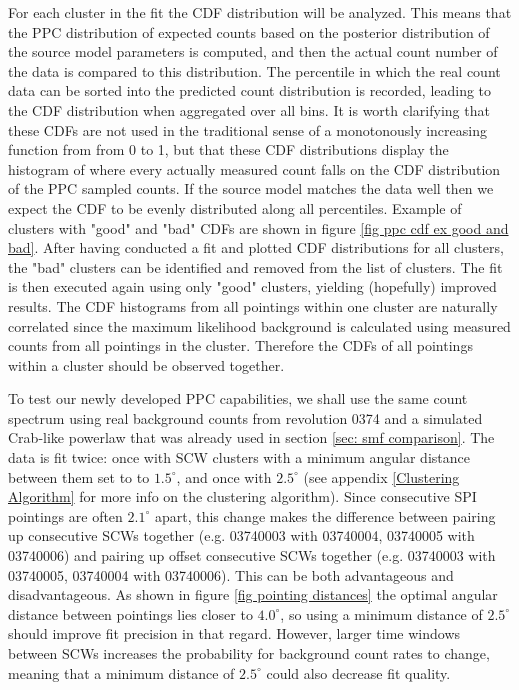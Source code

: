 \documentclass{report}
\begin{document}
For each cluster in the fit the CDF distribution will be analyzed. This means that the PPC distribution of expected counts based on the posterior distribution of the source model parameters is computed, and then the actual count number of the data is compared to this distribution. The percentile in which the real count data can be sorted into the predicted count distribution is recorded, leading to the CDF distribution when aggregated over all bins. It is worth clarifying that these CDFs are not used in the traditional sense of a monotonously increasing function from from 0 to 1, but that these CDF distributions display the histogram of where every actually measured count falls on the CDF distribution of the PPC sampled counts. If the source model matches the data well then we expect the CDF to be evenly distributed along all percentiles. Example of clusters with "good" and "bad" CDFs are shown in figure \ref{fig ppc cdf ex good and bad}. After having conducted a fit and plotted CDF distributions for all clusters, the "bad" clusters can be identified and removed from the list of clusters. The fit is then executed again using only "good" clusters, yielding (hopefully) improved results. The CDF histograms from all pointings within one cluster are naturally correlated since the maximum likelihood background is calculated using measured counts from all pointings in the cluster. Therefore the CDFs of all pointings within a cluster should be observed together.




To test our newly developed PPC capabilities, we shall use the same count spectrum using real background counts from revolution 0374 and a simulated Crab-like powerlaw that was already used in section \ref{sec: smf comparison}. The data is fit twice: once with SCW clusters with a minimum angular distance between them set to to $1.5^\circ$, and once with $2.5^\circ$ (see appendix \ref{Clustering Algorithm} for more info on the clustering algorithm). Since consecutive SPI pointings are often $2.1^\circ$ apart, this change makes the difference between pairing up consecutive SCWs together (e.g. 03740003 with 03740004, 03740005 with 03740006) and pairing up offset consecutive SCWs together (e.g. 03740003 with 03740005, 03740004 with 03740006). This can be both advantageous and disadvantageous. As shown in figure \ref{fig pointing distances} the optimal angular distance between pointings lies closer to $4.0^\circ$, so using a minimum distance of $2.5^\circ$ should improve fit precision in that regard. However, larger time windows between SCWs increases the probability for background count rates to change, meaning that a minimum distance of $2.5^\circ$ could also decrease fit quality. 
\end{document}
